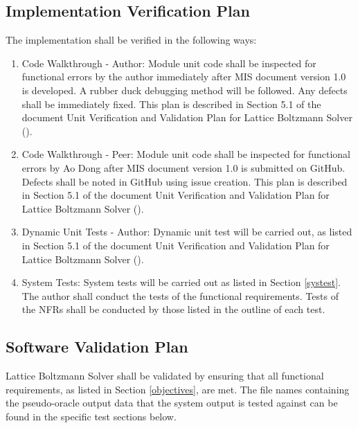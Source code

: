 \documentclass[12pt, titlepage]{article}
\newcommand{\famname}{Lattice Boltzmann Solver}
\begin{document}
\subsection{Implementation Verification Plan}
  
\noindent The implementation shall be verified in the following ways:

\begin{enumerate}
\item Code Walkthrough - Author: Module unit code shall be inspected for
  functional errors by the author immediately after MIS document version 1.0 is
  developed. A rubber duck debugging method will be followed. Any defects shall
  be immediately fixed. This plan is described in Section 5.1 of the document
  Unit Verification and Validation Plan for Lattice Boltzmann Solver
  (\citet{LBM_UVNV_PM}).
\item Code Walkthrough - Peer: Module unit code shall be inspected for
  functional errors by Ao Dong after MIS document version 1.0 is submitted on
  GitHub. Defects shall be noted in GitHub using issue creation. This plan is
  described in Section 5.1 of the document Unit Verification and Validation Plan
  for Lattice Boltzmann Solver (\citet{LBM_UVNV_PM}).
\item Dynamic Unit Tests - Author: Dynamic unit test will be carried out, as
  listed in Section 5.1 of the document Unit Verification and Validation Plan
  for Lattice Boltzmann Solver (\citet{LBM_UVNV_PM}).
\item System Tests: System tests will be carried out as listed in Section
  \ref{systest}. The author shall conduct the tests of the functional
  requirements. Tests of the NFRs shall be conducted by those listed in the
  outline of each test.
\end{enumerate}

\subsection{Software Validation Plan}

{\famname} shall be validated by ensuring that all functional requirements, as
listed in Section \ref{objectives}, are met. The file names containing the
pseudo-oracle output data that the system output is tested against can be found
in the specific test sections below.

\end{document}
